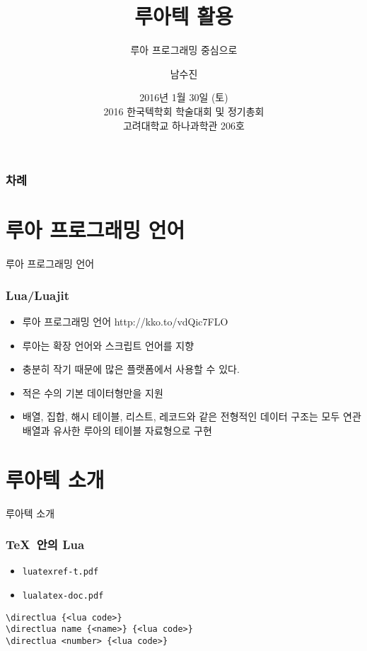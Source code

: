 \documentclass{beamer}
\title{루아텍 활용}
\subtitle{루아 프로그래밍 중심으로}
\author{남수진}
\date{ 2016년 1월 30일 (토)\\
  2016 한국텍학회 학술대회 및 정기총회 \\
  {\small 고려대학교 하나과학관 206호}}
\begin{document}
\begin{frame}
  \titlepage
\end{frame}

\begin{frame}[t]
  \frametitle{차례}
  \tableofcontents
\end{frame}

%
\section{루아 프로그래밍 언어}

\begin{frame}
  \huge
  \centering 루아 프로그래밍 언어
\end{frame}

\begin{frame}
  \frametitle{Lua/Luajit}
  \begin{itemize}
  \item 루아 프로그래밍 언어 http://kko.to/vdQic7FLO
  \item 루아는 확장 언어와 스크립트 언어를 지향
  \item 충분히 작기 때문에 많은 플랫폼에서 사용할 수 있다.
  \item 적은 수의 기본 데이터형만을 지원
  \item 배열, 집합, 해시 테이블, 리스트, 레코드와 같은 전형적인
    데이터 구조는 모두 연관 배열과 유사한 루아의 테이블 자료형으로 구현
  \end{itemize}
\end{frame}


%
\section{루아텍 소개}

\begin{frame}
  \huge
  \centering 루아텍 소개
\end{frame}

\begin{frame}[fragile]
  \frametitle{\TeX\ 안의 Lua}
  \begin{itemize}
  \item \texttt{luatexref-t.pdf}
  \item \texttt{lualatex-doc.pdf}
  \end{itemize}
\begin{verbatim}
\directlua {<lua code>}
\directlua name {<name>} {<lua code>}
\directlua <number> {<lua code>}
\end{verbatim}
\end{frame}
\end{document}
